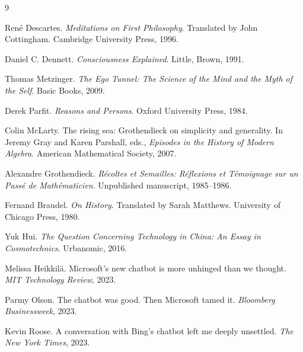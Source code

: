 \documentclass[12pt,a4paper]{article}
\begin{document}

\begin{thebibliography}{9}

Ren\'e Descartes.
\newblock \emph{Meditations on First Philosophy}.
\newblock Translated by John Cottingham. Cambridge University Press, 1996.

Daniel C. Dennett.
\newblock \emph{Consciousness Explained}.
\newblock Little, Brown, 1991.

Thomas Metzinger.
\newblock \emph{The Ego Tunnel: The Science of the Mind and the Myth of the Self}.
\newblock Basic Books, 2009.

Derek Parfit.
\newblock \emph{Reasons and Persons}.
\newblock Oxford University Press, 1984.

Colin McLarty.
\newblock The rising sea: Grothendieck on simplicity and generality.
\newblock In Jeremy Gray and Karen Parshall, eds., \emph{Episodes in the History of Modern Algebra}. American Mathematical Society, 2007.

Alexandre Grothendieck.
\newblock \emph{R\'ecoltes et Semailles: R\'eflexions et T\'emoignage sur un Pass\'e de Math\'ematicien}.
\newblock Unpublished manuscript, 1985--1986.

Fernand Braudel.
\newblock \emph{On History}.
\newblock Translated by Sarah Matthews. University of Chicago Press, 1980.

Yuk Hui.
\newblock \emph{The Question Concerning Technology in China: An Essay in Cosmotechnics}.
\newblock Urbanomic, 2016.

Melissa Heikkil\"a.
\newblock Microsoft's new chatbot is more unhinged than we thought.
\newblock \emph{MIT Technology Review}, 2023.

Parmy Olson.
\newblock The chatbot was good. Then Microsoft tamed it.
\newblock \emph{Bloomberg Businessweek}, 2023.

Kevin Roose.
\newblock A conversation with Bing's chatbot left me deeply unsettled.
\newblock \emph{The New York Times}, 2023.

\end{thebibliography}
\end{document}
